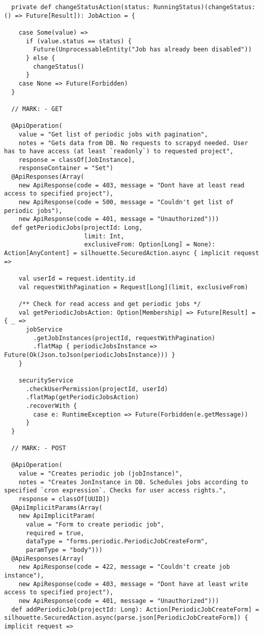 \begin{lstlisting}
  private def changeStatusAction(status: RunningStatus)(changeStatus: () => Future[Result]): JobAction = {

    case Some(value) =>
      if (value.status == status) {
        Future(UnprocessableEntity("Job has already been disabled"))
      } else {
        changeStatus()
      }
    case None => Future(Forbidden)
  }

  // MARK: - GET

  @ApiOperation(
    value = "Get list of periodic jobs with pagination",
    notes = "Gets data from DB. No requests to scrapyd needed. User has to have access (at least `readonly`) to requested project",
    response = classOf[JobInstance],
    responseContainer = "Set")
  @ApiResponses(Array(
    new ApiResponse(code = 403, message = "Dont have at least read access to specified project"),
    new ApiResponse(code = 500, message = "Couldn't get list of periodic jobs"),
    new ApiResponse(code = 401, message = "Unauthorized")))
  def getPeriodicJobs(projectId: Long,
                      limit: Int,
                      exclusiveFrom: Option[Long] = None): Action[AnyContent] = silhouette.SecuredAction.async { implicit request =>

    val userId = request.identity.id
    val requestWithPagination = Request[Long](limit, exclusiveFrom)

    /** Check for read access and get periodic jobs */
    val getPeriodicJobsAction: Option[Membership] => Future[Result] = { _ =>
      jobService
        .getJobInstances(projectId, requestWithPagination)
        .flatMap { periodicJobsInstance => Future(Ok(Json.toJson(periodicJobsInstance))) }
    }

    securityService
      .checkUserPermission(projectId, userId)
      .flatMap(getPeriodicJobsAction)
      .recoverWith {
        case e: RuntimeException => Future(Forbidden(e.getMessage))
      }
  }

  // MARK: - POST

  @ApiOperation(
    value = "Creates periodic job (jobInstance)",
    notes = "Creates JonInstance in DB. Schedules jobs according to specified `cron expression`. Checks for user access rights.",
    response = classOf[UUID])
  @ApiImplicitParams(Array(
    new ApiImplicitParam(
      value = "Form to create periodic job",
      required = true,
      dataType = "forms.periodic.PeriodicJobCreateForm",
      paramType = "body")))
  @ApiResponses(Array(
    new ApiResponse(code = 422, message = "Couldn't create job instance"),
    new ApiResponse(code = 403, message = "Dont have at least write access to specified project"),
    new ApiResponse(code = 401, message = "Unauthorized")))
  def addPeriodicJob(projectId: Long): Action[PeriodicJobCreateForm] = silhouette.SecuredAction.async(parse.json[PeriodicJobCreateForm]) { implicit request =>


\end{lstlisting}
